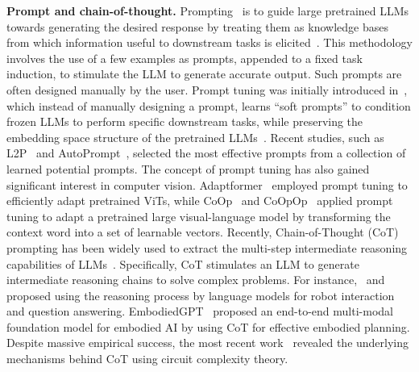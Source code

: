 \noindent \textbf{Prompt and chain-of-thought.}
Prompting~\cite{brown2020language} is to guide large pretrained LLMs towards generating the desired response by treating them as knowledge bases from which information useful to downstream tasks is elicited~\cite{petroni2019language}. This methodology involves the use of a few examples as prompts, appended to a fixed task induction, to stimulate the LLM to generate accurate output. Such prompts are often designed manually by the user. Prompt tuning was initially introduced in~\cite{lester2021power}, which instead of manually designing a prompt, learns ``soft prompts'' to condition frozen LLMs to perform specific downstream tasks, while preserving the embedding space structure of the pretrained LLMs~\cite{gao2021making}. Recent studies, such as L2P~\cite{wang2022learning} and AutoPrompt~\cite{shin2020autoprompt}, selected the most effective prompts from a collection of learned potential prompts. The concept of prompt tuning has also gained significant interest in computer vision. Adaptformer~\cite{chen2022adaptformer} employed prompt tuning to efficiently adapt pretrained ViTs, while CoOp~\cite{zhou2022learning} and CoOpOp~\cite{zhou2022conditional} applied prompt tuning to adapt a pretrained large visual-language model by transforming the context word into a set of learnable vectors. Recently, Chain-of-Thought (CoT) prompting has been widely used to extract the multi-step intermediate reasoning capabilities of LLMs~\cite{wei2022chain}. Specifically, CoT stimulates an LLM to generate intermediate reasoning chains to solve complex problems. For instance,~\cite{huang2023inner} and~\cite{lu2022learn} proposed using the reasoning process by language models for robot interaction and question answering. EmbodiedGPT~\cite{mu2024embodiedgpt} proposed an end-to-end multi-modal foundation model for embodied AI by using CoT for effective embodied planning. Despite massive empirical success, the most recent work~\cite{feng2024towards} revealed the underlying mechanisms behind CoT using circuit complexity theory.

